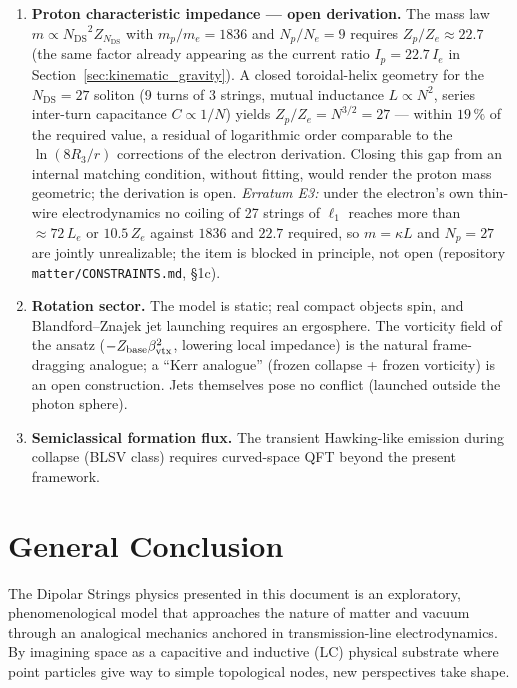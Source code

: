 \documentclass[11pt,a4paper]{article}
\theoremstyle{plain}
\theoremstyle{remark}
\newcommand{\Ncd}{\ensuremath{N_{\mathrm{DS}}}}
\begin{document}
\begin{enumerate}
    \item \textbf{Proton characteristic impedance --- open derivation.} The mass law $m \propto \Ncd^2 Z_{\Ncd}$ with $m_p/m_e = 1836$ and $N_p/N_e = 9$ requires $Z_p/Z_e \approx 22.7$ (the same factor already appearing as the current ratio $I_p = 22.7\,I_e$ in Section~\ref{sec:kinematic_gravity}). A closed toroidal-helix geometry for the $\Ncd = 27$ soliton (9 turns of 3 strings, mutual inductance $L \propto N^2$, series inter-turn capacitance $C \propto 1/N$) yields $Z_p/Z_e = N^{3/2} = 27$ --- within $19\,\%$ of the required value, a residual of logarithmic order comparable to the $\ln(8R_3/r)$ corrections of the electron derivation. Closing this gap from an internal matching condition, without fitting, would render the proton mass geometric; the derivation is open. \emph{Erratum E3:} under the electron's own thin-wire electrodynamics no coiling of 27 strings of $\ell_1$ reaches more than $\approx 72\,L_e$ or $10.5\,Z_e$ against $1836$ and $22.7$ required, so $m = \kappa L$ and $N_p = 27$ are jointly unrealizable; the item is blocked in principle, not open (repository \texttt{matter/CONSTRAINTS.md}, \S1c).
    \item \textbf{Rotation sector.} The model is static; real compact objects spin, and Blandford--Znajek jet launching requires an ergosphere. The vorticity field of the ansatz ($-Z_{\rm base}\beta^2_{\rm vtx}$, lowering local impedance) is the natural frame-dragging analogue; a ``Kerr analogue'' (frozen collapse + frozen vorticity) is an open construction. Jets themselves pose no conflict (launched outside the photon sphere).
    \item \textbf{Semiclassical formation flux.} The transient Hawking-like emission during collapse (BLSV class) requires curved-space QFT beyond the present framework.
\end{enumerate}

\section{General Conclusion}
The Dipolar Strings physics presented in this document is an exploratory, phenomenological model that approaches the nature of matter and vacuum through an analogical mechanics anchored in transmission-line electrodynamics. By imagining space as a capacitive and inductive (LC) physical substrate where point particles give way to simple topological nodes, new perspectives take shape.
\end{document}
